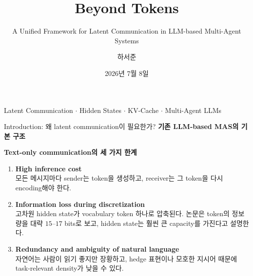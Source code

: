 \documentclass[
11pt,notheorems,hyperref={pdfauthor=whatever}
]{beamer}
\title[]{Beyond Tokens}
\subtitle{A Unified Framework for Latent Communication in LLM-based Multi-Agent Systems}
\author[]{하서준}
\institute{DGIST}
\date{2026년 7월 8일}
\begin{document}
{
\begin{frame}
  \titlepage
  \vspace{-0.8em}
  \begin{center}
  \scriptsize
  Latent Communication \(\cdot\) Hidden States \(\cdot\) KV-Cache \(\cdot\) Multi-Agent LLMs
  \end{center}
\end{frame}
}
\addtocounter{framenumber}{-1}

\begin{frame}[t]{Introduction: 왜 latent communication이 필요한가?}
\small
\textbf{기존 LLM-based MAS의 기본 구조}
\vspace{0.2em}

\begin{center}
\end{center}

\vspace{0.45em}
\textbf{\textcolor{WarnRed}{Text-only communication의 세 가지 한계}}
\vspace{0.2em}
\begin{enumerate}
  \item \textbf{High inference cost}\\
  모든 메시지마다 sender는 token을 생성하고, receiver는 그 token을 다시 encoding해야 한다.

  \item \textbf{Information loss during discretization}\\
  고차원 hidden state가 vocabulary token 하나로 압축된다.
  논문은 token의 정보량을 대략 \(15\)--\(17\) bits로 보고, hidden state는 훨씬 큰 capacity를 가진다고 설명한다.

  \item \textbf{Redundancy and ambiguity of natural language}\\
  자연어는 사람이 읽기 좋지만 장황하고, hedge 표현이나 모호한 지시어 때문에 task-relevant density가 낮을 수 있다.
\end{enumerate}
\end{frame}
\end{document}
